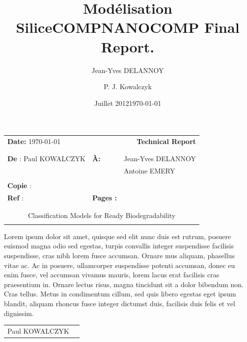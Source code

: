 \documentclass[10pt, letter]{report}
\title{Modélisation Silice}
\date{Juillet 2012}
\author{Jean-Yves DELANNOY}
\renewcommand{\=}{\, =\, }
\newcommand{\+}{\, +\, }
\renewcommand{\-}{\, -\, }
\begin{document}
\title{\textbf{COMPNANOCOMP Final Report.}}


\author{P. J. Kowalczyk}
\date{\today}

\vspace*{1cm}
\hspace*{-1cm}\begin{tabular}{p{}p{}p{}}
{\bf Date:} \today & \multicolumn{2}{r}{{\huge \bf{Technical Report }}}\\
\\
\hline
\\
{\bf De} : Paul KOWALCZYK  & \bf{\`A:} & Jean-Yves DELANNOY \\
&& Antoine EMERY \\

 \\
{\bf Copie} :   \\
{\bf Ref} :&  {\bf Pages : }  & \pageref{LastPage} \\
\\
\hline
\\
\multicolumn{3}{c}{\LARGE Classification Models for Ready Biodegradability} \\
\\
\hline
\end{tabular}
%
\vspace*{2cm}

Lorem ipsum dolor sit amet, quisque sed elit nunc duis est rutrum, posuere euismod magna odio sed egestas, turpis convallis integer suspendisse facilisis suspendisse, cras nibh lorem fusce accumsan. Ornare mus aliquam, phasellus vitae ac. Ac in posuere, ullamcorper suspendisse potenti accumsan, donec eu enim fusce, vel accumsan vivamus mauris, lorem lacus erat facilisis cras praesentium in. Ornare lectus risus, magna tincidunt sit a dolor bibendum non. Cras tellus. Metus in condimentum cillum, sed quis libero egestas eget ipsum blandit, aliquam rhoncus fusce integer dictumst duis, facilisis duis felis et vel dignissim.


\vspace*{1cm}
\begin{tabular*}{5.03\textwidth}{lr}
Paul KOWALCZYK\\
\end{tabular*}

\tableofcontents
\end{document}
